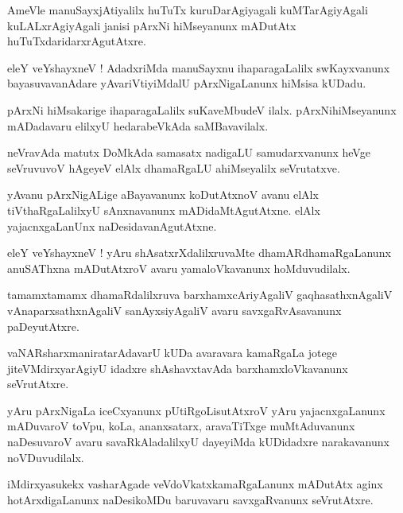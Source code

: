 \documentclass{article}
\begin{document}
\begin{mn}
AmeVle manuSayxjAtiyalilx huTuTx kuruDarAgiyagali kuMTarAgiyAgali kuLALxrAgiyAgali janisi pArxNi 
hiMseyanunx mADutAtx huTuTxdaridarxrAgutAtxre.
\end{mn}

\begin{mn}
eleY veYshayxneV ! AdadxriMda manuSayxnu ihaparagaLalilx swKayxvanunx bayasuvavanAdare 
yAvariVtiyiMdalU pArxNigaLanunx hiMsisa kUDadu.
\end{mn}

\begin{mn}
pArxNi hiMsakarige ihaparagaLalilx suKaveMbudeV ilalx. pArxNihiMseyanunx mADadavaru elilxyU 
hedarabeVkAda saMBavavilalx.
\end{mn}

\begin{mn}
neVravAda matutx DoMkAda samasatx nadigaLU samudarxvanunx heVge seVruvuvoV hAgeyeV elAlx dhamaRgaLU
ahiMseyalilx seVrutatxve.
\end{mn}

\begin{mn}
yAvanu pArxNigALige aBayavanunx koDutAtxnoV avanu elAlx tiVthaRgaLalilxyU sAnxnavanunx 
mADidaMtAgutAtxne. elAlx yajacnxgaLanUnx naDesidavanAgutAtxne.
\end{mn}

\begin{mn}
eleY veYshayxneV ! yAru shAsatxrXdalilxruvaMte dhamARdhamaRgaLanunx  anuSAThxna mADutAtxroV avaru 
yamaloVkavanunx hoMduvudilalx. 
\end{mn}

\begin{mn}
tamamxtamamx dhamaRdalilxruva barxhamxcAriyAgaliV gaqhasathxnAgaliV vAnaparxsathxnAgaliV 
sanAyxsiyAgaliV avaru savxgaRvAsavanunx paDeyutAtxre.
\end{mn}

\begin{mn}
vaNARsharxmaniratarAdavarU kUDa avaravara kamaRgaLa jotege jiteVMdirxyarAgiyU idadxre 
shAshavxtavAda barxhamxloVkavanunx seVrutAtxre.
\end{mn}


\begin{mn}
yAru pArxNigaLa iceCxyanunx pUtiRgoLisutAtxroV yAru yajacnxgaLanunx mADuvaroV toVpu, koLa,
ananxsatarx, aravaTiTxge muMtAduvanunx naDesuvaroV avaru savaRkAladalilxyU dayeyiMda kUDidadxre
narakavanunx noVDuvudilalx.
\end{mn}

\begin{mn}
iMdirxyasukekx vasharAgade veVdoVkatxkamaRgaLanunx mADutAtx aginx hotArxdigaLanunx naDesikoMDu 
baruvavaru savxgaRvanunx seVrutAtxre.
\end{mn}
\end{document}
